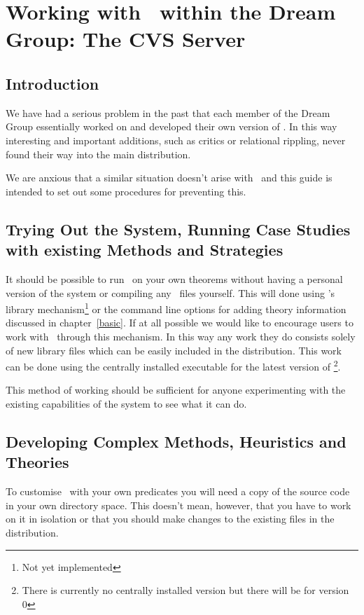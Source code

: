\chapter{Working with \lclam\ within the Dream Group: The CVS Server}

\section{Introduction}
We have had a serious problem in the past that each member of the
Dream Group essentially worked on and developed their own version of
\clam.  In this way interesting and important additions, such as
critics or relational rippling, never found their way into the main
distribution.

We are anxious that a similar situation doesn't arise with \lclam\ and 
this guide is intended to set out some procedures for preventing this.

\section{Trying Out the System, Running Case Studies with existing
  Methods and Strategies}

It should be possible to run \lclam\ on your own theorems without having a
personal version of the system or compiling any \lprolog\ files
yourself.  This will done using \lclam's library
mechanism\footnote{Not yet implemented} or the command line options
for adding theory information discussed in chapter~\ref{basic}.  If at
all possible we would like to 
encourage users to work with \lclam\ through this mechanism.  In this
way any work they do consists solely of new library files which can be 
easily included in the distribution.  This work can be done using the
centrally installed executable for the latest version of
\lclam\footnote{There is currently no centrally installed version but
  there will be for version 0}.  

This method of working should be sufficient for anyone
experimenting with the existing capabilities of the system to see what 
it can do.

\section{Developing Complex Methods, Heuristics and Theories}

To customise \lclam\ with your own predicates you will need
a copy of the source code in your own directory space.  This doesn't
mean, however, that you have to work on it in isolation or that you
should make changes to the existing files in the distribution.

